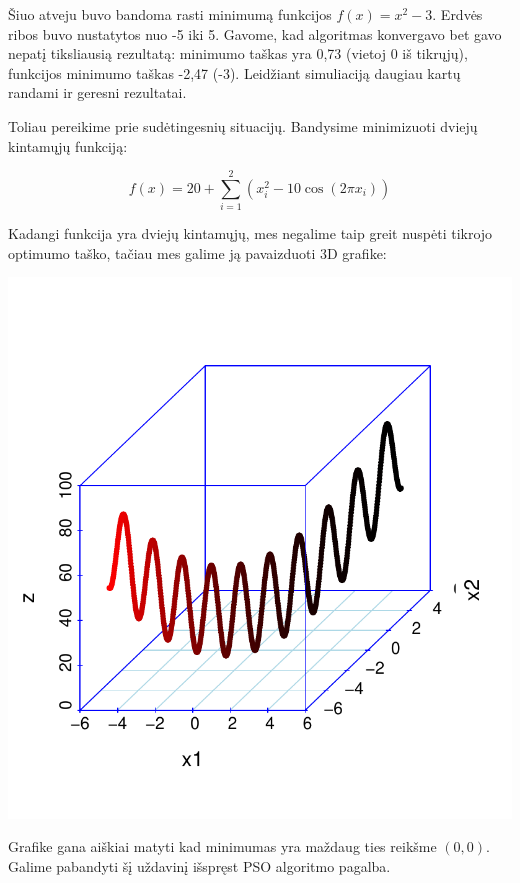 \documentclass[12pt,a4paper]{article}
\begin{document}
\bigskip

Šiuo atveju buvo bandoma rasti minimumą funkcijos $f(x) = x^2 - 3$. Erdvės ribos buvo nustatytos nuo -5 iki 5. Gavome, kad algoritmas konvergavo bet gavo nepatį tiksliausią rezultatą: minimumo taškas yra 0,73 (vietoj 0 iš tikrųjų), funkcijos minimumo taškas -2,47 (-3). Leidžiant simuliaciją daugiau kartų randami ir geresni rezultatai.

Toliau pereikime prie sudėtingesnių situacijų. Bandysime minimizuoti dviejų kintamųjų funkciją:

\begin{equation}
f(x) = 20 + \sum\limits_{i=1}^{2} ( x_i^2 - 10 \cos (2\pi x_i ))
\end{equation}

Kadangi funkcija yra dviejų kintamųjų, mes negalime taip greit nuspėti tikrojo optimumo taško, tačiau mes galime ją pavaizduoti 3D grafike:

\begin{center}
\includegraphics[scale=0.57]{Rplot.pdf}
\end{center}

Grafike gana aiškiai matyti kad minimumas yra maždaug ties reikšme $(0,0)$. Galime pabandyti šį uždavinį išspręst PSO algoritmo pagalba.
\end{document}
